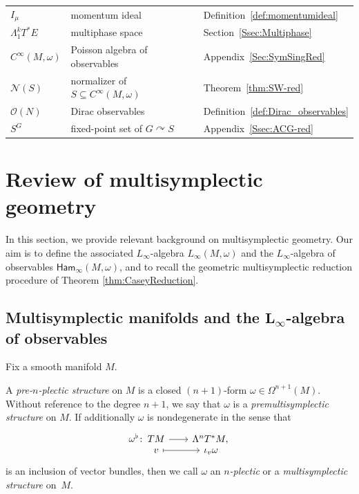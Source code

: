 \documentclass[pdftex]{sigma}
\numberwithin{equation}{section}
\newcommand{\Ham}{\mathsf{Ham}}
\renewcommand{\subset}{\subseteq}
\newcommand{\morphism}[5]{%
  \begin{tikzcd}[
    column sep=2em,
    row sep=-.5ex,
    ampersand replacement=\&
  ]
  #1\colon~ \&[-3em]
  #2\vphantom{#3} \arrow[r] \&
  #3\vphantom{#2} \\
  \&
  #4\vphantom{#5} \arrow[r,mapsto] \&
  #5\vphantom{#4}
  \end{tikzcd}%
}
\begin{document}
\begin{table}[t]
\begin{tabular}{lll}
		$I_\mu$			&momentum ideal				&Definition~\ref{def:momentumideal}		\\
		$\Lambda^k_1T^*E$	&multiphase space			&Section~\ref{Ssec:Multiphase}		\\
				$C^\infty(M,\omega)$	&Poisson algebra of observables	&Appendix~\ref{Sec:SymSingRed}		\\
		$\mathcal{N}(S)$	&normalizer of $S\subset C^\infty(M,\omega)$	&Theorem~\ref{thm:SW-red}	\\
		$\mathcal{O}(N)$	&Dirac observables			&Definition~\ref{def:Dirac_observables}			\\
		$S^G$			&fixed-point set of $G\curvearrowright S$	&Appendix~\ref{Ssec:ACG-red}		\\
	\end{tabular}
\end{table}

\section{Review of multisymplectic geometry}\label{Sec:MultiReview}

In this section, we provide relevant background on multisymplectic geometry. Our aim is to define the associated $L_\infty$-algebra $L_\infty(M,\omega)$ and the $L_\infty$-algebra of observables $\Ham_\infty(M,\omega)$, and to recall the geometric multisymplectic reduction procedure of Theorem \ref{thm:CaseyReduction}.


\subsection[Multisymplectic manifolds and the L\_infty-algebra of observables]{Multisymplectic manifolds and the $\boldsymbol{L_\infty}$-algebra of observables}%

Fix a smooth manifold $M$.

\begin{Definition}\label{def:MultisymplecticManifold}
	A \emph{pre-$n$-plectic structure} on $M$ is a closed $(n+1)$-form $\omega\in\Omega^{n+1}(M)$. Without reference to the degree $n+1$, we say that $\omega$ is a \emph{premultisymplectic structure} on $M$. If additionally $\omega$ is nondegenerate in the sense that
	\begin{displaymath}
		\morphism{\omega^\flat}
		{TM}{\Lambda^nT^*M,}
		{v}{\iota_v\omega}
	\end{displaymath}
	is an inclusion of vector bundles, then we call $\omega$ an \emph{$n$-plectic} or a \emph{multisymplectic structure} on~$M$.
\end{Definition}
\end{document}
